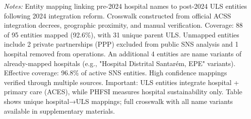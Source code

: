 \documentclass[12pt,oneside]{article}
\begin{document}
\begin{table}[htbp]
\centering
\caption{Hospital to ULS Entity Crosswalk (2024 Integration Reform)}
\label{tab:entity_crosswalk}
\footnotesize
\begin{threeparttable}

\begin{tablenotes}
\small
\item \textit{Notes:} Entity mapping linking pre-2024 hospital names to post-2024 ULS entities following 2024 integration reform. Crosswalk constructed from official ACSS integration decrees, geographic proximity, and manual verification. Coverage: 88 of 95 entities mapped (92.6\%), with 31 unique parent ULS. Unmapped entities include 2 private partnerships (PPP) excluded from public SNS analysis and 1 hospital removed from operations. An additional 4 entities are name variants of already-mapped hospitals (e.g., "Hospital Distrital Santarém, EPE" variants). Effective coverage: 96.8\% of active SNS entities. High confidence mappings verified through multiple sources. Important: ULS entities integrate hospital + primary care (ACES), while PHFSI measures hospital sustainability only. Table shows unique hospital→ULS mappings; full crosswalk with all name variants available in supplementary materials.
\end{tablenotes}
\end{threeparttable}
\end{table}
\end{document}
